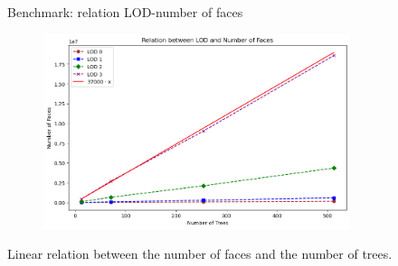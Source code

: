 \documentclass[12pt]{beamer}
\begin{document}
\begin{frame}{Benchmark: relation LOD-number of faces}
  \begin{figure}[H]
    \centering
    \includegraphics[width=0.8\textwidth]{images/bench_ntree_nfaces.png}
\end{figure}
Linear relation between the number of faces and the number of trees.
\end{frame}
\end{document}

